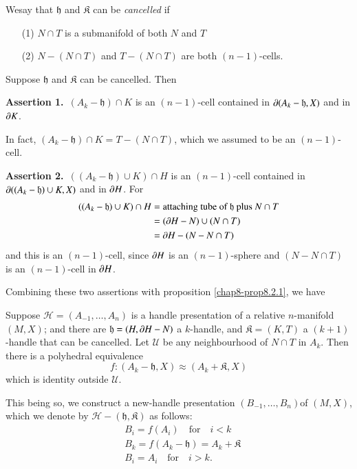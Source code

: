 \begin{definition}\label{chap8-defi8.5.1}
We\pageoriginale say that $\mathfrak{h}$ and $\mathfrak{K}$ can be {\em cancelled} if
\begin{itemize}
\item[(1)] $N\cap T$ is a submanifold of both $N$ and $T$

\item[(2)] $N-(N\cap T)$ and $T-(N\cap T)$ are both $(n-1)$-cells.
\end{itemize}

Suppose $\mathfrak{h}$ and $\mathfrak{K}$ can be cancelled. Then
\medskip

\noindent
{\bf Assertion 1.}~$(A_{k}-\mathfrak{h})\cap K$ is an $(n-1)$-cell contained in $\partial (A_{k}-\mathfrak{h},X)$ and in $\partial K$.

In fact, $(A_{k}-\mathfrak{h})\cap K=T-(N\cap T)$, which we assumed to be an $(n-1)$-cell.

\medskip
\noindent
{\bf Assertion 2.}~$((A_{k}-\mathfrak{h})\cup K)\cap H$ is an $(n-1)$-cell contained in $\partial((A_{k}-\mathfrak{h})\cup K,X)$ and in $\partial H$. For
\begin{align*}
((A_{k}-\mathfrak{h})\cup K)\cap H &= \text{attaching tube of } \mathfrak{h} \text{~ plus~ } N\cap T\\
&= (\partial H-N)\cup (N\cap T)\\
&= \partial H-(N-N\cap T)
\end{align*}
and this is an $(n-1)$-cell, since $\partial H$ is an $(n-1)$-sphere and $(N-N\cap T)$ is an $(n-1)$-cell in $\partial H$.
\end{definition}

Combining these two assertions with proposition \ref{chap8-prop8.2.1}, we have

\begin{proposition}\label{chap8-prop8.5.2}
Suppose $\mathscr{H}=(A_{-1},\ldots,A_{n})$ is a handle presentation of a relative $n$-manifold $(M,X)$; and there are $\mathfrak{h}=(H,\partial H-N)$ a $k$-handle, and $\mathfrak{K}=(K,T)$ a $(k+1)$-handle that can be cancelled. Let $\mathscr{U}$ be any neighbourhood of $N\cap T$ in $A_{k}$. Then there is a polyhedral equivalence
$$
f:(A_{k}-\mathfrak{h},X)\approx (A_{k}+\mathfrak{K},X)
$$
which is identity outside $\mathscr{U}$.
\end{proposition}

This being so, we construct a new-handle presentation $(B_{-1},\ldots,B_{n})$\pageoriginale of $(M,X)$, which we denote by $\mathscr{H}-(\mathfrak{h},\mathfrak{K})$ as follows:
\begin{align*}
& B_{i}=f(A_{i})\quad\text{for}\quad i<k\\
& B_{k}=f(A_{k}-\mathfrak{h})=A_{k}+\mathfrak{K}\\
& B_{i}=A_{i}\quad\text{for}\quad i>k.
\end{align*}

